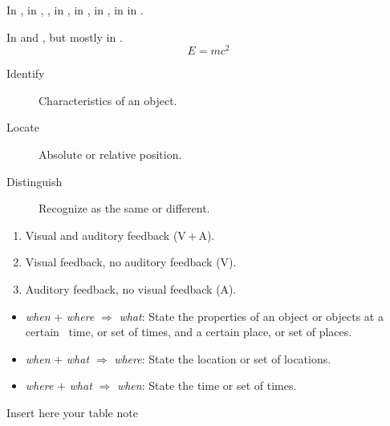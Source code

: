 \lipsum[1]

In , in , , in , in , in , in  in .

In \cite{Abril07} and \cite{Cohen07}, but mostly in \cite{Abril07,Cohen07}.
\begin{equation}
E=mc^{2}
\label{eqn:sample}
\end{equation}


\begin{description}
	\item[Identify] Characteristics of an object.
	\item[Locate] Absolute or relative position.
	\item[Distinguish] Recognize as the same or different.
\end{description}


\begin{enumerate}
	\item Visual and auditory feedback (V\,$+$\,A).
	\item Visual feedback, no auditory feedback (V).
	\item Auditory feedback, no visual feedback (A).
\end{enumerate}


\begin{itemize}
	\item \textit{when} $+$ \textit{where} $\Rightarrow$
	\textit{what}: State the properties of an object or objects at a
	certain ~time, or set of times,  and a certain place, or set of places.
	\item \textit{when} $+$ \textit{what} $\Rightarrow$
	\textit{where}: State the location or set of locations.
	\item \textit{where} $+$ \textit{what} $\Rightarrow$
	\textit{when}: State the time or set of times.
\end{itemize}


\begin{table}[t]
	\begin{tabnote}
		Insert here your table note
	\end{tabnote}
	\label{tab:sample}
\end{table}


